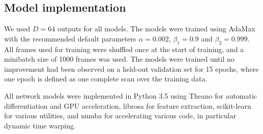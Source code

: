 
\subsection{Model implementation}

We used $D = 64$ outputs for all models.
The models were trained using AdaMax \parencite{kingma2014adam} with the recommended default parameters $\alpha = 0.002$, $\beta_1 = 0.9$ and $\beta_2 = 0.999$.
All frames used for training were shuffled once at the start of training, and a minibatch size of 1000 frames was used.
The models were trained until no improvement had been observed on a held-out validation set for 15 epochs, where one epoch is defined as one complete scan over the training data.

All network models were implemented in Python 3.5 using Theano \parencite{theano} for automatic differentiation and GPU acceleration, librosa \parencite{librosa} for feature extraction, scikit-learn \parencite{scikit-learn} for various utilities, and numba \parencite{numba} for accelerating various code, in particular dynamic time warping.

